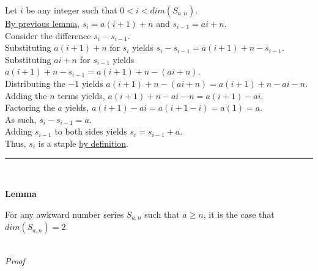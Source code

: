 \documentclass[a4paper,12pt]{article}
\begin{document}
\noindent Let $i$ be any integer such that $0 < i < dim(S_{a, n})$.\\

\noindent \hyperlink{lemma:basis_lengths}{By previous lemma}, $s_i = a(i + 1) + n$ and $s_{i - 1} = ai + n$.\\

\noindent Consider the difference $s_i - s_{i - 1}$.\\

\noindent Substituting $a(i + 1) + n$ for $s_i$ yields $s_i - s_{i - 1} = a(i + 1) + n - s_{i - 1}$.\\

\noindent Substituting $ai + n$ for $s_{i - 1}$ yields $a(i + 1) + n - s_{i - 1} = a(i + 1) + n - (ai + n)$.\\

\noindent Distributing the $-1$ yields $a(i + 1) + n - (ai + n) = a(i + 1) + n - ai - n$.\\

\noindent Adding the $n$ terms yields, $a(i + 1) + n - ai - n = a(i + 1) - ai$.\\

\noindent Factoring the $a$ yields, $a(i + 1) - ai = a(i + 1 - i) = a(1) = a$.\\

\noindent As such, $s_i - s_{i - 1} = a$.\\

\noindent Adding $s_{i - 1}$ to both sides yields $s_i = s_{i - 1} + a$.\\

\noindent Thus, $s_i$ is a staple \hyperlink{definition:staple}{by definition}.



\begin{center}
\noindent\rule{8cm}{0.4pt}
\end{center}
\noindent \\





\label{lemma:dimension_a_greater_equal_n}
\hypertarget{lemma:dimension_a_greater_equal_n}{}
\begin{tcolorbox}
\textbf{Lemma}

\noindent For any awkward number series $S_{a,n}$ such that $a \geq n$, it is the case that $dim(S_{a, n}) = 2$.

\end{tcolorbox}

\noindent \\
\textit{Proof}
\end{document}
